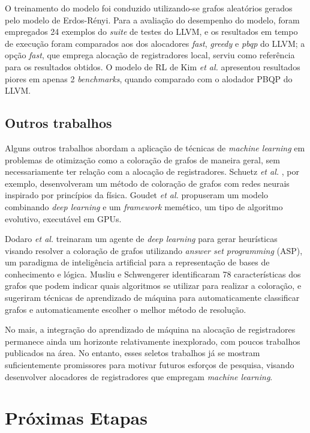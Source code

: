 \documentclass[
	12pt,				%
	openright,			%
	oneside,			%
	a4paper,			%
	tccpreliminar,			%
	]{ABNT-DC-UEL}
\begin{document}
O treinamento do modelo foi conduzido utilizando-se grafos aleatórios gerados pelo modelo de Erdos-Rényi. Para a avaliação do desempenho do modelo, foram empregados 24 exemplos do \textit{suite} de testes do LLVM, e os resultados em tempo de execução foram comparados aos dos alocadores \textit{fast}, \textit{greedy} e \textit{pbqp} do LLVM; a opção \textit{fast}, que emprega alocação de registradores local, serviu como referência para os resultados obtidos. O modelo de RL de Kim \textit{et al.} apresentou resultados piores em apenas 2 \textit{benchmarks}, quando comparado com o alodador PBQP do LLVM.

\section{Outros trabalhos}

Alguns outros trabalhos abordam a aplicação de técnicas de \textit{machine learning} em problemas de otimização como a coloração de grafos de maneira geral, sem necessariamente ter relação com a alocação de registradores. Schuetz \textit{et al.} \cite{schuetz:22}, por exemplo, desenvolveram um método de coloração de grafos com redes neurais inspirado por princípios da física. Goudet \textit{et al.} \cite{goudet:22} propuseram um modelo combinando \textit{deep learning} e um \textit{framework} memético, um tipo de algoritmo evolutivo, executável em GPUs. 

Dodaro \textit{et al.} \cite{dodaro:22} treinaram um agente de \textit{deep learning} para gerar heurísticas visando resolver a coloração de grafos utilizando \textit{answer set programming} (ASP), um paradigma de inteligência artificial para a representação de bases de conhecimento e lógica. Musliu e Schwengerer \cite{musliu:13} identificaram 78 características dos grafos que podem indicar quais algoritmos se utilizar para realizar a coloração, e sugeriram técnicas de aprendizado de máquina para automaticamente classificar grafos e automaticamente escolher o melhor método de resolução.

No mais, a integração do aprendizado de máquina na alocação de registradores permanece ainda um horizonte relativamente inexplorado, com poucos trabalhos publicados na área. No entanto, esses seletos trabalhos já se mostram suficientemente promissores para motivar futuros esforços de pesquisa, visando desenvolver alocadores de registradores que empregam \textit{machine learning}.

\chapter{Próximas Etapas}
\end{document}
